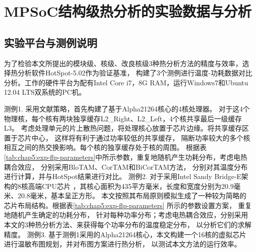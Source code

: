 

\chapter{MPSoC结构级热分析的实验数据与分析}
\label{cha:SSTAexperiments}

\section{实验平台与测例说明}
为了检验本文所提出的模块级、核级、改良核级3种热分析方法的精度与效率，选择热分析软件HotSpot-5.02作为验证基准， 构建了3个测例进行温度-功耗数据对比分析。工作的硬件平台为配有Intel Core i7，8G RAM，运行Windows7和Ubuntu 12.04 LTS双系统的PC机。

测例1. 采用文献策略，首先构建了基于Alpha21264核心的4核处理器。 对于这4个物理核，每个核有两块独享缓存L2\_Right、L2\_Left，4个核共享最后一级缓存L3。 考虑处理单元的片上散热问题，将处理核心放置于芯片边缘。将共享缓存区置于芯片中心， 这样将有利于通过功率较低的共享缓存， 隔断功率较大的多个核相互之间的热交换影响。每个核的独享缓存处于核的周围。 根据表\ref{tab:chap5:exp-flp-parameters}中所示参数，重复地随机产生功耗分布，考虑电热耦合效应， 分别采用BloTAM、CorTAM和BiCorTAM方法， 分别对其温度分布进行计算，并与HotSpot结果进行对比。
测例2. 对于采用Intel Sandy Bridge-E架构的8核高端CPU芯片 ，其核心面积为435平方毫米，长度和宽度分别为20.9毫米、20.8毫米，基本呈正方形。 本文按照其布局原则模拟生成了一种较为简略的芯片布局结构。根据表\ref{tab:chap5:exp-flp-parameters} 所示的参数设置方案， 重复地随机产生确定的功耗分布， 针对每种功率分布；考虑电热耦合效应，分别采用本文的3种热分析方法、来获得每个功率分布的温度稳定分布， 以分析它们的求解精度。
测例3. 基于测例1采用的Alpha21264核心，本文构建一个16核的虚拟芯片进行温敏布图规划，并对布图方案进行热分析， 以测试本文方法的运行效率。

